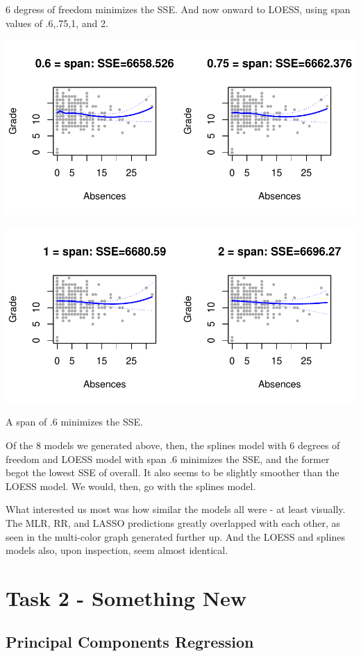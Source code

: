 \documentclass{article}
\begin{document}
6 degress of freedom minimizes the SSE. And now onward to LOESS, using span values of .6,.75,1, and 2.

\includegraphics{Report_4-011}

\includegraphics{Report_4-012}

A span of .6 minimizes the SSE.

Of the 8 models we generated above, then, the splines model with 6 degrees of freedom and LOESS model with span .6 minimizes the SSE, and the former begot the lowest SSE of overall. It also seems to be slightly smoother than the LOESS model. We would, then, go with the splines model.

What interested us most was how similar the models all were - at least visually. The MLR, RR, and LASSO predictions greatly overlapped with each other, as seen in the multi-color graph generated further up. And the LOESS and splines models also, upon inspection, seem almost identical. 

\section{Task 2 - Something New}

\subsection{Principal Components Regression}
\end{document}

